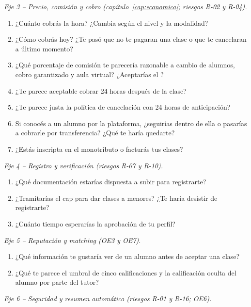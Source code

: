 \emph{Eje 3 -- Precio, comisión y cobro (capítulo~\ref{cap:economica};
riesgos R-02 y R-04).}

\begin{enumerate}[resume]
    \item ¿Cuánto cobrás la hora? ¿Cambia según el nivel y la modalidad?
    \item ¿Cómo cobrás hoy? ¿Te pasó que no te pagaran una clase o que te
          cancelaran a último momento?
    \item ¿Qué porcentaje de comisión te parecería razonable a cambio de
          alumnos, cobro garantizado y aula virtual? ¿Aceptarías el
          \comision{}?
    \item ¿Te parece aceptable cobrar 24 horas después de la clase?
    \item ¿Te parece justa la política de cancelación con 24 horas de
          anticipación?
    \item Si conocés a un alumno por la plataforma, ¿seguirías dentro de
          ella o pasarías a cobrarle por transferencia? ¿Qué te haría
          quedarte?
    \item ¿Estás inscripta en el monotributo o facturás tus clases?
\end{enumerate}

\emph{Eje 4 -- Registro y verificación (riesgos R-07 y R-10).}

\begin{enumerate}[resume]
    \item ¿Qué documentación estarías dispuesta a subir para registrarte?
    \item ¿Tramitarías el \gls{cap} para dar clases a menores? ¿Te haría
          desistir de registrarte?
    \item ¿Cuánto tiempo esperarías la aprobación de tu perfil?
\end{enumerate}

\emph{Eje 5 -- Reputación y \gls{matching} (OE3 y OE7).}

\begin{enumerate}[resume]
    \item ¿Qué información te gustaría ver de un alumno antes de aceptar
          una clase?
    \item ¿Qué te parece el umbral de cinco calificaciones y la
          calificación oculta del alumno por parte del tutor?
\end{enumerate}

\emph{Eje 6 -- Seguridad y resumen automático (riesgos R-01 y R-16; OE6).}

